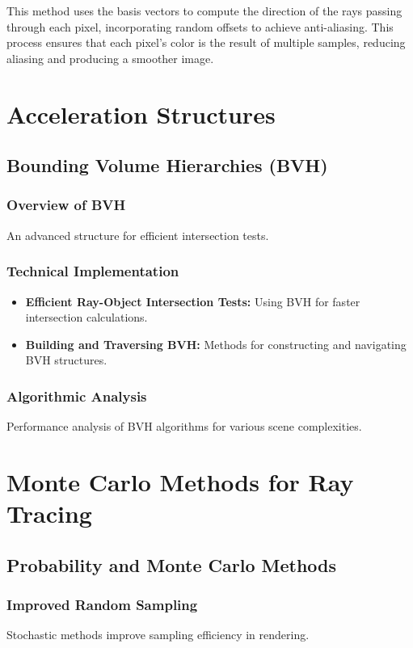 \documentclass[12pt]{article}
\begin{document}
This method uses the basis vectors to compute the direction of the rays passing through each pixel, incorporating random offsets to achieve anti-aliasing. This process ensures that each pixel's color is the result of multiple samples, reducing aliasing and producing a smoother image.

\section{Acceleration Structures}
\label{sec:acceleration-structures}
\subsection{Bounding Volume Hierarchies (BVH)}
\subsubsection{Overview of BVH}
An advanced structure for efficient intersection tests.
\subsubsection{Technical Implementation}
\begin{itemize}
    \item \textbf{Efficient Ray-Object Intersection Tests:} Using BVH for faster intersection calculations.
    \item \textbf{Building and Traversing BVH:} Methods for constructing and navigating BVH structures.
\end{itemize}
\subsubsection{Algorithmic Analysis}
Performance analysis of BVH algorithms for various scene complexities.

\section{Monte Carlo Methods for Ray Tracing}
\label{sec:monte-carlo}

\subsection{Probability and Monte Carlo Methods}
\subsubsection{Improved Random Sampling}
Stochastic methods improve sampling efficiency in rendering.
\end{document}
